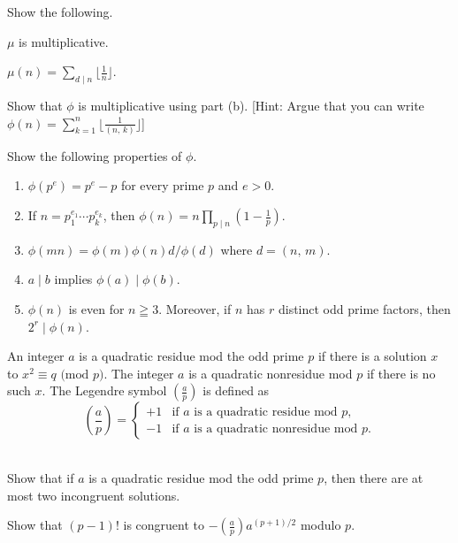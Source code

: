 \documentclass[a4paper,11pt]{article}
\theoremstyle{mythm}
\theoremstyle{mydef}
\renewcommand{\pmod}[1]{\text{ (mod $#1$)}}
\begin{document}
 Show the following.
\begin{enumerate*}[{\bf (a)}]
\item $\mu$ is multiplicative.
\item $\mu(n)=\sum_{d \mid n}\lfloor \frac{1}{n} \rfloor$.
\item Show that $\phi$ is multiplicative using part (b). [Hint: Argue that you
  can write $\phi(n)=\sum_{k = 1}^n\lfloor \frac{1}{(n,\,k)} \rfloor$] \\
\end{enumerate*}

 Show the following properties of $\phi$.
\begin{enumerate}[{\bf (a)}]
\item $\phi(p^e)=p^e-p$ for every prime $p$ and $e>0$.
\item If $n=p_1^{e_1} \cdots p_k^{e_k}$, then $\phi(n)=n\prod_{p \mid
    n}(1-\frac{1}{p})$.
\item $\phi(mn)=\phi(m)\phi(n)d/\phi(d)$ where $d=(n,\,m)$.
\item $a \mid b$ implies $\phi(a) \mid \phi(b)$.
\item $\phi(n)$ is even for $n \geqq 3$. Moreover, if $n$ has $r$ distinct odd
  prime factors, then $2^r \mid \phi(n)$. \\
\end{enumerate}

An integer $a$ is a quadratic residue mod the odd prime $p$ if there is a
solution $x$ to $x^2 \equiv q \pmod{p}$. The integer $a$ is a quadratic
nonresidue mod $p$ if there is no such $x$. The Legendre symbol $(\frac{a}{p})$
is defined as
\[
  \left( \frac{a}{p} \right) =
  \begin{cases}
    +1 & \text{if $a$ is a quadratic residue mod $p$,} \\
    -1 & \text{if $a$ is a quadratic nonresidue mod $p$.}
  \end{cases}
\] \\

\begin{enumerate*}[{\bf (a)}]
\item Show that if $a$ is a quadratic residue mod the odd prime $p$, then there
  are at most two incongruent solutions.
\item Show that $(p-1)!$ is congruent to $-\left( \frac{a}{p}
  \right)a^{(p+1)/2}$ modulo $p$.
\end{enumerate*}
\end{document}
